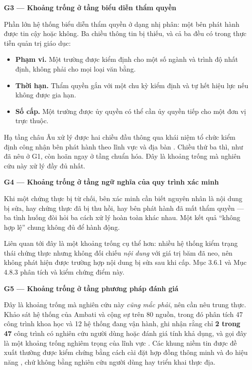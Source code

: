 \noindent \textbf{G3 --- Khoảng trống ở tầng biểu diễn thẩm quyền}

Phần lớn hệ thống biểu diễn thẩm quyền ở dạng nhị phân: một bên phát hành được tin cậy hoặc không. Ba chiều thông tin bị thiếu, và cả ba đều có trong thực tiễn quản trị giáo dục:

\begin{itemize}
    \item \textbf{Phạm vi.} Một trường được kiểm định cho một số ngành và trình độ nhất định, không phải cho mọi loại văn bằng.
    \item \textbf{Thời hạn.} Thẩm quyền gắn với một chu kỳ kiểm định và tự hết hiệu lực nếu không được gia hạn.
    \item \textbf{Số cấp.} Một trường được ủy quyền có thể cần ủy quyền tiếp cho một đơn vị trực thuộc.
\end{itemize}

Hạ tầng châu Âu xử lý được hai chiều đầu thông qua khái niệm tổ chức kiểm định công nhận bên phát hành theo lĩnh vực và địa bàn \cite{EBSI_TrustModel}. Chiều thứ ba thì, như đã nêu ở G1, còn hoãn ngay ở tầng chuẩn hóa. Đây là khoảng trống mà nghiên cứu này xử lý đầy đủ nhất.

\noindent \textbf{G4 --- Khoảng trống ở tầng ngữ nghĩa của quy trình xác minh}

Khi một chứng thực bị từ chối, bên xác minh cần biết nguyên nhân là nội dung bị sửa, hay chứng thực đã bị thu hồi, hay bên phát hành đã mất thẩm quyền --- ba tình huống đòi hỏi ba cách xử lý hoàn toàn khác nhau. Một kết quả {``}không hợp lệ{''} chung không đủ để hành động.

Liên quan tới đây là một khoảng trống cụ thể hơn: nhiều hệ thống kiểm trạng thái chứng thực nhưng không đối chiếu \emph{nội dung} với giá trị băm đã neo, nên không phát hiện được trường hợp nội dung bị sửa sau khi cấp. Mục 3.6.1 và Mục 4.8.3 phân tích và kiểm chứng điểm này.

\noindent \textbf{G5 --- Khoảng trống ở tầng phương pháp đánh giá}

Đây là khoảng trống mà nghiên cứu này \emph{cũng mắc phải}, nên cần nêu trung thực. Khảo sát hệ thống của Ambati và cộng sự trên 80 nguồn, trong đó phân tích 47 công trình khoa học và 12 hệ thống đang vận hành, ghi nhận rằng chỉ \textbf{2 trong 47} công trình có nghiên cứu người dùng hoặc đánh giá tính khả dụng, và gọi đây là một khoảng trống nghiêm trọng của lĩnh vực \cite{Ambati2026}. Các khung niềm tin được đề xuất thường được kiểm chứng bằng cách cài đặt hợp đồng thông minh và đo hiệu năng \cite{DeSalve2023}, chứ không bằng nghiên cứu người dùng hay triển khai thực địa.


